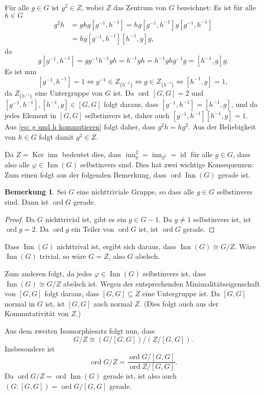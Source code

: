 \documentclass[a4paper,10pt]{article}
\theoremstyle{definition}
\newtheorem{bem}[beh]{Bemerkung}
\newcommand{\id}{\operatorname{id}}
\newcommand{\ord}{\operatorname{ord}}
\newcommand{\inn}{\operatorname{inn}}
\newcommand{\Ker}{\operatorname{Ker}}
\newcommand{\Inn}{\operatorname{Inn}}
\begin{document}
Für alle $g \in G$ ist $g^2 \in Z$, wobei $Z$ das Zentrum von $G$ bezeichnet: Es ist für alle $h \in G$
\begin{equation}\label{eq: g und h kommutieren}
 \begin{aligned}
  g^2 h
  &= g h g \left[g^{-1},h^{-1}\right]
  = h g \left[g^{-1},h^{-1}\right] g \left[g^{-1},h^{-1}\right] \\
  &= h g \left[g^{-1},h^{-1}\right] \left[h^{-1},g\right] g,
 \end{aligned}
\end{equation}
da
\[
 g \left[g^{-1},h^{-1}\right]
 = g g^{-1} h^{-1} g h = h^{-1} g h = h^{-1} g h g^{-1} g = \left[h^{-1},g\right] g.
\]
Es ist nun
\[
 \left[g^{-1},h^{-1}\right] = 1
 \Leftrightarrow g^{-1}  \in Z_{\{h^{-1}\}}
 \Leftrightarrow g \in Z_{\{h^{-1}\}}
 \Leftrightarrow \left[h^{-1},g\right] = 1,
\]
da $Z_{\{h^{-1}\}}$ eine Untergruppe von $G$ ist. Da $\ord\,[G,G] = 2$ und $\left[g^{-1},h^{-1}\right], \left[h^{-1},g\right] \in [G,G]$ folgt daraus, dass $\left[g^{-1},h^{-1}\right] = \left[h^{-1},g\right]$, und da jedes Element in $[G,G]$ selbstinvers ist, daher auch $\left[g^{-1},h^{-1}\right] \left[h^{-1},g\right] = 1$. Aus \eqref{eq: g und h kommutieren} folgt daher, dass $g^2h = hg^2$. Aus der Beliebigkeit von $h \in G$ folgt damit $g^2 \in Z$.

Da $Z = \Ker \inn$ bedeutet dies, dass $\inn_g^2 = \inn_{g^2} = \id$ für alle $g \in G$, dass also alle $\varphi \in \Inn(G)$ selbstinvers sind. Dies hat zwei wichtige Konsequenzen: Zum einen folgt aus der folgenden Bemerkung, dass $\ord \Inn(G)$ gerade ist.

\begin{bem}
 Sei $G$ eine nichttriviale Gruppe, so dass alle $g \in G$ selbstinvers sind. Dann ist $\ord G$ gerade.
\end{bem}
\begin{proof}
 Da $G$ nichttrivial ist, gibt es ein $g \in G-1$. Da $g \neq 1$ selbstinvers ist, ist $\ord g = 2$. Da $\ord g$ ein Teiler von $\ord G$ ist, ist $\ord G$ gerade.
\end{proof}

Dass $\Inn(G)$ nichttrival ist, ergibt sich daraus, dass $\Inn(G) \cong G/Z$. Wäre $\Inn(G)$ trivial, so wäre $G = Z$, also $G$ abelsch.

Zum anderen folgt, da jedes $\varphi \in \Inn(G)$ selbstinvers ist, dass $\Inn(G) \cong G/Z$ abelsch ist. Wegen der entsprechenden Minimalitätseigenschaft von $[G,G]$ folgt daraus, dass $[G,G] \subseteq Z$ eine Untergruppe ist. Da $[G,G]$ normal in $G$ ist, ist $[G,G]$ auch normal $Z$. (Dies folgt auch aus der Kommutativität von $Z$.)

Aus dem zweiten Isomorphiesatz folgt nun, dass
\[
 G/Z \cong (G/[G,G])/(Z/[G,G]).
\]
Insbesondere ist
\[
 \ord G/Z = \frac{\ord G/[G,G]}{\ord Z/[G,G]}.
\]
Da $\ord G/Z = \ord \Inn(G)$ gerade ist, ist also auch $(G : [G,G]) = \ord G/[G,G]$ gerade.
\end{document}
